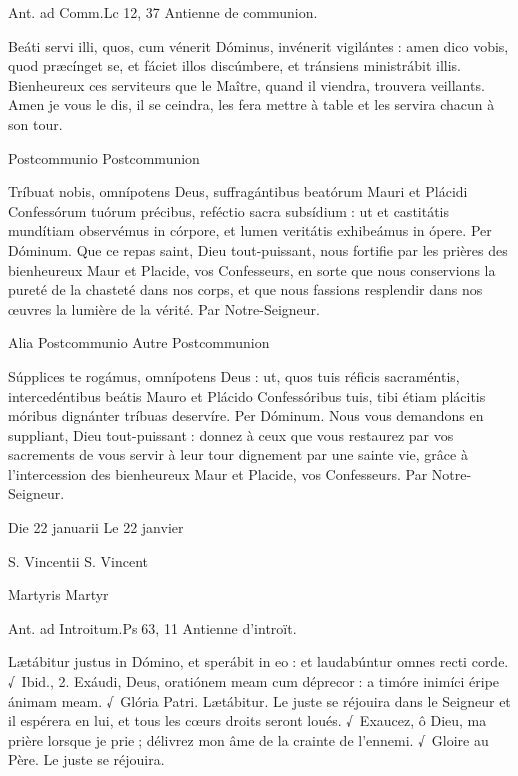 \begin{paracol}{2}
Ant. ad Comm.\hfill Lc 12, 37
\switchcolumn
Antienne de communion.
\switchcolumn*

Beáti servi illi, quos, cum vénerit Dóminus, invénerit vigilántes : amen dico vobis, quod præcínget se, et fáciet illos discúmbere, et tránsiens ministrábit illis.
\switchcolumn
Bienheureux ces serviteurs que le Maître, quand il viendra, trouvera veillants. Amen je vous le dis, il se ceindra, les fera mettre à table et les servira chacun à son tour.
\switchcolumn*

Postcommunio
\switchcolumn
Postcommunion
\switchcolumn*

Tríbuat nobis, omnípotens Deus,  suffragántibus beatórum Mauri et Plácidi Confessórum tuórum précibus, reféctio sacra subsídium : ut et castitátis mundítiam observémus in córpore, et lumen veritátis exhibeámus in ópere. Per Dóminum.
\switchcolumn
Que ce repas saint, Dieu tout-puissant,  nous fortifie par les prières des bienheureux Maur et Placide, vos Confesseurs, en sorte que nous conservions la pureté de la chasteté dans nos corps, et que nous fassions resplendir dans nos œuvres la lumière de la vérité. Par Notre-Seigneur.
\switchcolumn*

Alia Postcommunio
\switchcolumn
Autre Postcommunion
\switchcolumn*

Súpplices te rogámus, omnípotens  Deus : ut, quos tuis réficis sacraméntis, intercedéntibus beátis Mauro et Plácido Confessóribus tuis, tibi étiam plácitis móribus dignánter tríbuas deservíre. Per Dóminum.
\switchcolumn
Nous vous demandons en suppliant,  Dieu tout-puissant : donnez à ceux que vous restaurez par vos sacrements de vous servir à leur tour dignement par une sainte vie, grâce à l’intercession des bienheureux Maur et Placide, vos Confesseurs. Par Notre-Seigneur.
\switchcolumn*

Die 22 januarii
\switchcolumn
Le 22 janvier
\switchcolumn*

S. Vincentii
\switchcolumn
S. Vincent
\switchcolumn*

Martyris
\switchcolumn
Martyr
\switchcolumn*

Ant. ad Introitum.\hfill Ps 63, 11
\switchcolumn
Antienne d’introït.
\switchcolumn*

Lætábitur justus in Dómino, et  sperábit in eo : et laudabúntur omnes recti corde. √~Ibid., 2. Exáudi, Deus, oratiónem meam cum déprecor : a timóre inimíci éripe ánimam meam. √~Glória Patri. Lætábitur.
\switchcolumn
Le juste se réjouira dans le Seigneur et il  espérera en lui, et tous les cœurs droits seront loués. √~Exaucez, ô Dieu, ma prière lorsque je prie ; délivrez mon âme de la crainte de l’ennemi. √~Gloire au Père. Le juste se réjouira.
\switchcolumn*


\end{paracol}

